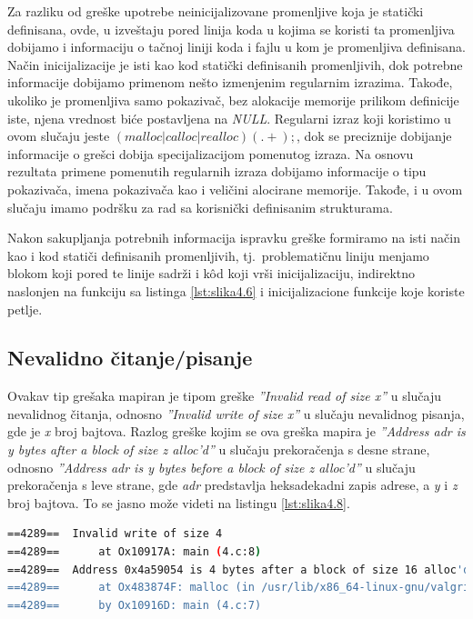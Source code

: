 \documentclass[12pt,oneside]{memoir}
\theoremstyle{plain}
\theoremstyle{definition}
\begin{document}
Za razliku od greške upotrebe neinicijalizovane promenljive koja je statički definisana, ovde, u izveštaju pored linija koda u kojima se koristi ta promenljiva dobijamo i informaciju o tačnoj liniji koda i fajlu u kom je promenljiva definisana. Način inicijalizacije je isti kao kod statički definisanih promenljivih, dok potrebne informacije dobijamo primenom nešto izmenjenim regularnim izrazima. Takođe, ukoliko je promenljiva samo pokazivač, bez alokacije memorije prilikom definicije iste, njena vrednost biće postavljena na \textit{NULL}. Regularni izraz koji koristimo u ovom slučaju jeste $ (malloc|calloc|realloc)(.+); $, dok se preciznije dobijanje informacije o grešci dobija specijalizacijom pomenutog izraza. Na osnovu rezultata primene pomenutih regularnih izraza dobijamo informacije o tipu pokazivača, imena pokazivača kao i veličini alocirane memorije. Takođe, i u ovom slučaju imamo podršku za rad sa korisnički definisanim strukturama. 

Nakon sakupljanja potrebnih informacija ispravku greške formiramo na isti način kao i kod statiči definisanih promenljivih, tj.~problematičnu liniju menjamo blokom koji pored te linije sadrži i k\^od koji vrši inicijalizaciju, indirektno naslonjen na funkciju sa listinga \ref{lst:slika4.6} i inicijalizacione funkcije koje koriste petlje.

\subsection{Nevalidno čitanje/pisanje}
Ovakav tip grešaka mapiran je tipom greške \textit{''Invalid read of size x''} u slučaju nevalidnog čitanja, odnosno \textit{''Invalid write of size x''} u slučaju nevalidnog pisanja, gde je \textit{x} broj bajtova. Razlog greške kojim se ova greška mapira je \textit{''Address adr is y bytes after a block of size z alloc'd''} u slučaju prekoračenja s desne strane, odnosno \textit{''Address adr is y bytes before a block of size z alloc'd''} u slučaju prekoračenja s leve strane, gde \textit{adr} predstavlja heksadekadni zapis adrese, a \textit{y} i \textit{z} broj bajtova. To se jasno može videti na listingu \ref{lst:slika4.8}.


\begin{lstlisting}[style=terminal,caption={Ispis greške nevalidnog čitanja}, label={lst:slika4.8},language={bash}]   
==4289==  Invalid write of size 4
==4289==      at Ox10917A: main (4.c:8)
==4289==  Address 0x4a59054 is 4 bytes after a block of size 16 alloc'd
==4289==      at Ox483874F: malloc (in /usr/lib/x86_64-linux-gnu/valgrind/vgpreload_memcheck-amd64-linux.so) 
==4289==      by Ox10916D: main (4.c:7)
\end{lstlisting}
\end{document}
